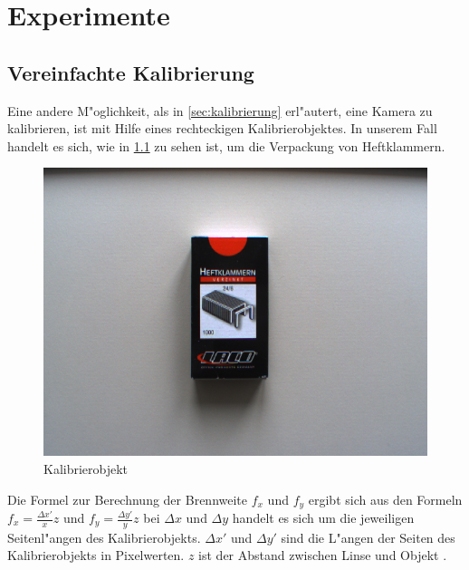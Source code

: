\chapter{Experimente}
\label{cha:experimente}

\section{Vereinfachte Kalibrierung}
\label{sec:vereinfachtekalib}

Eine andere M"oglichkeit, als in \ref{sec:kalibrierung} erl"autert, eine Kamera zu kalibrieren, ist mit Hilfe eines rechteckigen Kalibrierobjektes. In unserem Fall handelt es sich, wie in \ref{fig:klammern} zu sehen ist, um die Verpackung von Heftklammern.
 
\begin{figure}[H]
	\includegraphics[scale=0.5]{bilder/experimentcalib}
	\caption[Kalibrierobjekt]{Kalibrierobjekt}
	\label{fig:klammern}
\end{figure}

\noindent Die Formel zur Berechnung der Brennweite $f_x$ und $f_y$ ergibt sich aus den Formeln \newline
$f_x=\frac{\Delta x'}{x}z$ und $f_y=\frac{\Delta y'}{y}z$\newline
bei $\Delta x$ und $\Delta y$ handelt es sich um die jeweiligen Seitenl"angen des Kalibrierobjekts.\newline
$\Delta x'$ und $\Delta y'$ sind die L"angen der Seiten des Kalibrierobjekts in Pixelwerten. $z$ ist der Abstand zwischen Linse und Objekt \cite{PCV} \cite{CVF}.

